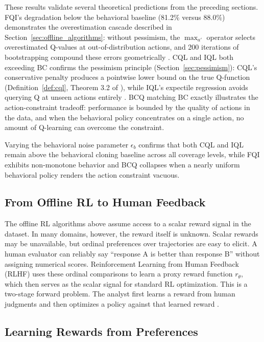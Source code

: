 These results validate several theoretical predictions from the preceding sections. FQI's degradation below the behavioral baseline (81.2\% versus 88.0\%) demonstrates the overestimation cascade described in Section~\ref{sec:offline_algorithms}: without pessimism, the $\max_{a'}$ operator selects overestimated Q-values at out-of-distribution actions, and 200 iterations of bootstrapping compound these errors geometrically \citep{Fujimoto2019}. CQL and IQL both exceeding BC confirms the pessimism principle (Section~\ref{sec:pessimism}): CQL's conservative penalty produces a pointwise lower bound on the true Q-function (Definition~\ref{def:cql}, Theorem 3.2 of \citealt{Kumar2020}), while IQL's expectile regression avoids querying Q at unseen actions entirely \citep{Kostrikov2022}. BCQ matching BC exactly illustrates the action-constraint tradeoff: performance is bounded by the quality of actions in the data, and when the behavioral policy concentrates on a single action, no amount of Q-learning can overcome the constraint.

Varying the behavioral noise parameter $\epsilon_b$ confirms that both CQL and IQL remain above the behavioral cloning baseline across all coverage levels, while FQI exhibits non-monotone behavior and BCQ collapses when a nearly uniform behavioral policy renders the action constraint vacuous.

\subsection{From Offline RL to Human Feedback}
\label{section:rlhf}

The offline RL algorithms above assume access to a scalar reward signal in the dataset. In many domains, however, the reward itself is unknown. Scalar rewards may be unavailable, but ordinal preferences over trajectories are easy to elicit. A human evaluator can reliably say ``response A is better than response B'' without assigning numerical scores. Reinforcement Learning from Human Feedback (RLHF) uses these ordinal comparisons to learn a proxy reward function $r_\theta$, which then serves as the scalar signal for standard RL optimization. This is a two-stage forward problem. The analyst first learns a reward from human judgments and then optimizes a policy against that learned reward \citep{christiano:2017}.

\subsection{Learning Rewards from Preferences}

